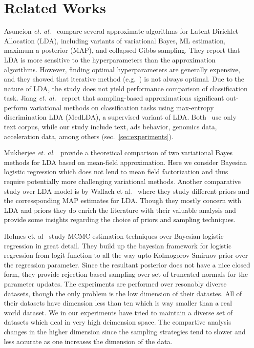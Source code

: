 \section{Related Works}

Asuncion {\it et. al.}~\cite{Asuncion2009smoothing} compare several
approximate algorithms for Latent Dirichlet Allocation (LDA), including
variants of variational Bayes, ML estimation, maximum a posterior (MAP), and
collapsed Gibbs sampling. They report that LDA is more sensitive to the
hyperparameters than the approximation algorithms. However, finding optimal
hyperparameters are generally expensive, and they showed that iterative method
(e.g.~\cite{Minka00}) is not always optimal. Due to the nature of LDA, the
study does not yield performance comparison of classification task. Jiang {\it
et. al.}~\cite{medlda_MCMC12} report that sampling-based approximations
significant out-perform variational methods on classification tasks using
max-entropy discrimination LDA (MedLDA), a supervised variant of LDA.
Both~\cite{Asuncion2009smoothing, medlda_MCMC12} use only text corpus, while
our study include text, ads behavior, genomics data, acceleration data, among
others (sec.~\ref{sec:experiments}). 

Mukherjee {\it et. al.}~\cite{Mukherjee08} provide a theoretical comparison of
two variational Bayes methods for LDA based on mean-field approximation. Here
we consider Bayesian logistic regression which does not lend to mean field
factorization and thus require potentially more challenging variational
methods. Another comparative study over LDA model is by Wallach et
al.~\cite{WallachMM09} where they study different priors and the
corressponding MAP estimates for LDA. Though they mostly concern with LDA and
priors they do enrich the literature with their valuable analysis and provide
some insights regarding the choice of priors and sampling techniques. 

Holmes et. al~\cite{Holmes} study MCMC estimation techniques over Bayesian logistic
regression in great detail. They build up the bayesian framework for logistic
regression from logit function to all the way upto Kolmogorov-Smirnov prior over
the regression parameter. Since the resultant posterior does not have a nice
closed form, they provide rejection based sampling over set of truncated
normals for the parameter updates. The experiments are performed over resonably
diverse datasets, though the only problem is the low dimension of their
datastes. All of their datasets have dimension less than ten which is way
smaller than a real world dataset. We in our experiments have tried to maintain
a diverse set of datasets which deal in very high deimension space. The
compartive analysis changes in the higher dimension since the sampling
strategies tend to slower and less accurate as one increases the dimension of
the data. 

